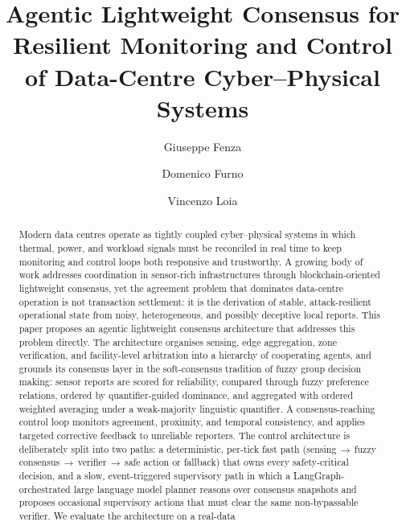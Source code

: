 \documentclass[preprint,11pt]{elsarticle}
\begin{document}
\begin{frontmatter}

\title{Agentic Lightweight Consensus for Resilient Monitoring and
Control of Data-Centre Cyber--Physical Systems}

\author[unisa]{Giuseppe Fenza}

\author[unisa]{Domenico Furno}

\author[unisa]{Vincenzo Loia}


\address[unisa]{Department of Management and Innovation Systems,
University of Salerno, Fisciano (SA), Italy}

\begin{abstract}
Modern data centres operate as tightly coupled cyber--physical systems
in which thermal, power, and workload signals must be reconciled in
real time to keep monitoring and control loops both responsive and
trustworthy. A growing body of work addresses coordination in sensor-rich
infrastructures through blockchain-oriented lightweight consensus, yet
the agreement problem that dominates data-centre operation is not
transaction settlement: it is the derivation of stable, attack-resilient
operational state from noisy, heterogeneous, and possibly deceptive
local reports. This paper proposes an agentic lightweight consensus
architecture that addresses this problem directly. The architecture
organises sensing, edge aggregation, zone verification, and
facility-level arbitration into a hierarchy of cooperating agents, and
grounds its consensus layer in the soft-consensus tradition of fuzzy
group decision making: sensor reports are scored for reliability,
compared through fuzzy preference relations, ordered by
quantifier-guided dominance, and aggregated with ordered weighted
averaging under a weak-majority linguistic quantifier. A
consensus-reaching control loop monitors agreement, proximity, and
temporal consistency, and applies targeted corrective feedback to
unreliable reporters. The control architecture is deliberately split
into two paths: a deterministic, per-tick fast path
(sensing\,$\rightarrow$\,fuzzy consensus\,$\rightarrow$\,verifier\,$\rightarrow$\,safe
action or fallback) that owns every safety-critical decision, and a
slow, event-triggered supervisory path in which a LangGraph-orchestrated
large language model planner reasons over consensus snapshots and
proposes occasional supervisory actions that must clear the same
non-bypassable verifier. We evaluate the architecture on a real-data

\end{abstract}
\end{frontmatter}
\end{document}
